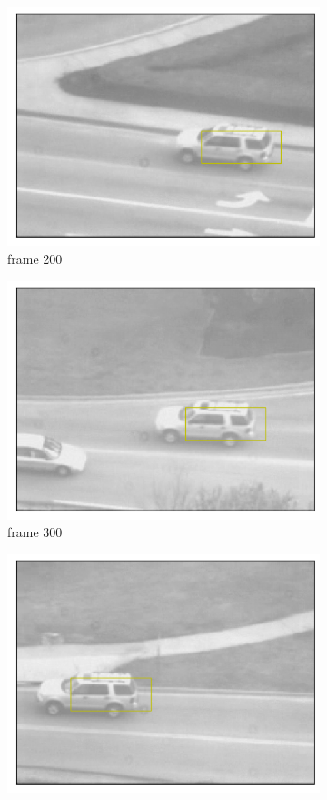 \documentclass[11pt]{article}
\begin{document}
\begin{figure}[h!]
\begin{subfigure}{.195\textwidth}
      \includegraphics[width=.95\linewidth]{../results/carseqrects_199.png}
      \caption{frame 200}
    \end{subfigure}
    \begin{subfigure}{.195\textwidth}
      \centering
      \includegraphics[width=.95\linewidth]{../results/carseqrects_299.png}
      \caption{frame 300}
    \end{subfigure}
    \begin{subfigure}{.195\textwidth}
      \centering
      \includegraphics[width=.95\linewidth]{../results/carseqrects_399.png}

\end{subfigure}
\end{figure}
\end{document}
